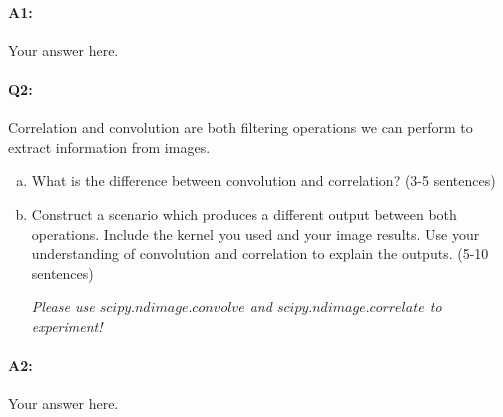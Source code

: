 \pagebreak
\paragraph{A1:} Your answer here.



\pagebreak
\paragraph{Q2:} Correlation and convolution are both filtering operations we can perform to extract information from images.
\begin{enumerate}[(a)]
    \item 
    What is the difference between convolution and correlation? (3-5 sentences)

    \item
    Construct a scenario which produces a different output between both operations. Include the kernel you used and your image results. Use your understanding of convolution and correlation to explain the outputs. (5-10 sentences)
    
    \emph{Please use \href{https://docs.scipy.org/doc/scipy/reference/generated/scipy.ndimage.convolve.html}{$scipy.ndimage.convolve$} and \href{https://docs.scipy.org/doc/scipy/reference/generated/scipy.ndimage.correlate.html}{$scipy.ndimage.correlate$} to experiment!}
    
\end{enumerate}


\paragraph{A2:} Your answer here.


